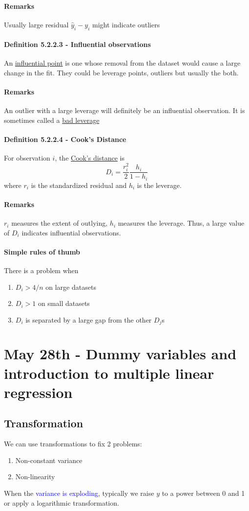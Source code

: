\documentclass[11pt]{article}
\newcommand{\under}[1]{\underline{#1}}
\begin{document}
\paragraph{Remarks}
Usually large residual $\hat{y}_i - y_i$ might indicate outliers
\paragraph{Definition 5.2.2.3 - Influential observations}
An \under{influential point} is one whose removal from the dataset would cause a large change in the fit. They could be leverage points, outliers but usually the both.
\paragraph{Remarks}
An outlier with a large leverage will definitely be an influential observation. It is sometimes called a \under{bad leverage}
\paragraph{Definition 5.2.2.4 - Cook's Distance}
For observation $i$, the \under{Cook's distance} is $$D_i = \frac{r_i^2}{2} \frac{h_i}{1-h_i}$$ where $r_i$ is the standardized residual and $h_i$ is the leverage.
\paragraph{Remarks}
$r_i$ measures the extent of outlying, $h_i$ measures the leverage. Thus, a large value of $D_i$ indicates influential observations.
\paragraph{Simple rules of thumb} There is a problem when
\begin{enumerate}
    \item $D_i > 4/n$ on large datasets
    \item $D_i > 1$ on small datasets
    \item $D_i$ is separated by a large gap from the other $D_j$s
\end{enumerate}

\section{May 28th - Dummy variables and introduction to multiple linear regression}
\subsection{Transformation}
We can use transformations to fix 2 problems:
\begin{enumerate}
	\item Non-constant variance
	\item Non-linearity
\end{enumerate}
When the \textcolor{blue}{variance is exploding}, typically we raise $y$ to a power between 0 and 1 or apply a logarithmic transformation.
\end{document}
